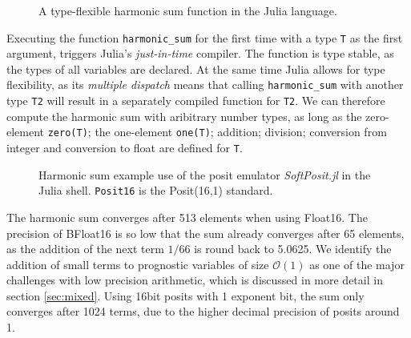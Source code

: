 \documentclass[draft]{agujournal2019}
\begin{document}
\begin{figure}[htbp]
%
%
%
%
\caption{A type-flexible harmonic sum function in the Julia language.}
\label{fig:emulator}
\end{figure}

Executing the function \texttt{harmonic\_sum} for the first time with a type \texttt{T} as the first argument, triggers Julia's \emph{just-in-time} compiler. The function is type stable, as the types of all variables are declared. At the same time Julia allows for type flexibility, as its \emph{multiple dispatch} means that calling  \texttt{harmonic\_sum} with another type \texttt{T2} will result in a separately compiled function for \texttt{T2}. We can therefore compute the harmonic sum with aribitrary number types, as long as the zero-element \texttt{zero(T)}; the one-element \texttt{one(T)}; addition; division; conversion from integer and conversion to float are defined for \texttt{T}. 

\begin{figure}[htbp]
\caption{Harmonic sum example use of the posit emulator \emph{SoftPosit.jl} in the Julia shell. \texttt{Posit16} is the Posit(16,1) standard.}
\label{fig:emulator}
\end{figure}

The harmonic sum converges after 513 elements when using Float16. The precision of BFloat16 is so low that the sum already converges after 65 elements, as the addition of the next term $1/66$ is round back to 5.0625. We identify the addition of small terms to prognostic variables of size $\mathcal{O}(1)$ as one of the major challenges with low precision arithmetic, which is discussed in more detail in section \ref{sec:mixed}. Using 16bit posits with 1 exponent bit, the sum only converges after 1024 terms, due to the higher decimal precision of posits around 1. 
\end{document}
